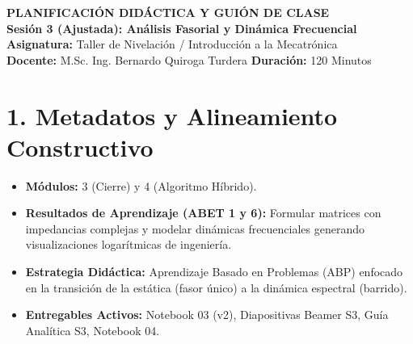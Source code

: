 \documentclass[11pt,a4paper]{article}
\begin{document}
\begin{center}
    {\Large \textbf{\textcolor{UCBblue}{PLANIFICACIÓN DIDÁCTICA Y GUIÓN DE CLASE}}}\\
    \vspace{0.3cm}
    {\large \textbf{Sesión 3 (Ajustada): Análisis Fasorial y Dinámica Frecuencial}}\\
    \vspace{0.5cm}
    \textbf{Asignatura:} Taller de Nivelación / Introducción a la Mecatrónica \\
    \textbf{Docente:} M.Sc. Ing. Bernardo Quiroga Turdera \quad \textbf{Duración:} 120 Minutos
\end{center}

\vspace{0.3cm}

\section*{1. Metadatos y Alineamiento Constructivo}
\begin{itemize}
    \item \textbf{Módulos:} 3 (Cierre) y 4 (Algoritmo Híbrido).
    \item \textbf{Resultados de Aprendizaje (ABET 1 y 6):} Formular matrices con impedancias complejas y modelar dinámicas frecuenciales generando visualizaciones logarítmicas de ingeniería.
    \item \textbf{Estrategia Didáctica:} Aprendizaje Basado en Problemas (ABP) enfocado en la transición de la estática (fasor único) a la dinámica espectral (barrido).
    \item \textbf{Entregables Activos:} Notebook 03 (v2), Diapositivas Beamer S3, Guía Analítica S3, Notebook 04.
\end{itemize}
\end{document}
